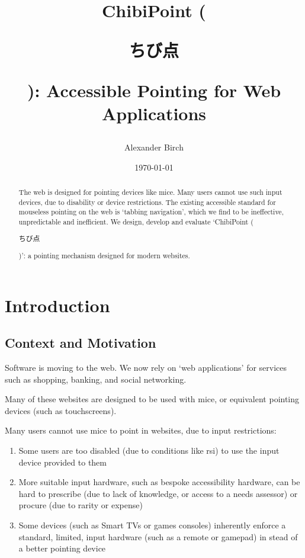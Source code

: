\documentclass[a4paper, 12pt]{report}
\title{ChibiPoint (\begin{CJK}{UTF8}{min}ちび点\end{CJK}): Accessible Pointing for Web Applications}
\author{Alexander Birch}
\date{\today}
\begin{document}

\maketitle
\begin{abstract}
The web is designed for pointing devices like mice. Many users cannot use such input devices, due to disability or device restrictions. The existing accessible standard for mouseless pointing on the web is `tabbing navigation', which we find to be ineffective, unpredictable and inefficient. We design, develop and evaluate `ChibiPoint (\begin{CJK}{UTF8}{min}ちび点\end{CJK})': a pointing mechanism designed for modern websites.
\end{abstract}

\tableofcontents


\chapter{Introduction}

\section{Context and Motivation}
Software is moving to the web. We now rely on `web applications' for services such as shopping, banking, and social networking.

Many of these websites are designed to be used with mice, or equivalent pointing devices (such as touchscreens).

Many users cannot use mice to point in websites, due to input restrictions:
\begin{enumerate}
\item Some users are too disabled (due to conditions like \gls{rsi}) to use the input device provided to them
\item More suitable input hardware, such as bespoke accessibility hardware, can be hard to prescribe (due to lack of knowledge, or access to a needs assessor) or procure (due to rarity or expense)
\item Some devices (such as Smart TVs or games consoles) inherently enforce a standard, limited, input hardware (such as a remote or gamepad) in stead of a better pointing device
\end{enumerate}
\end{document}
